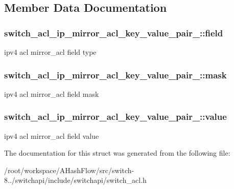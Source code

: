 \subsection{Member Data Documentation}
\hypertarget{structswitch__acl__ip__mirror__acl__key__value__pair___a58b2aea4bac0ee482f8e10d3db2c3076}{
\subsubsection[{field}]{ switch\+\_\+acl\+\_\+ip\+\_\+mirror\+\_\+acl\+\_\+key\+\_\+value\+\_\+pair\+\_\+\+::field}}\label{structswitch__acl__ip__mirror__acl__key__value__pair___a58b2aea4bac0ee482f8e10d3db2c3076}
ipv4 acl mirror\+\_\+acl field type \hypertarget{structswitch__acl__ip__mirror__acl__key__value__pair___a6c192f608bb8140f71580178ab7fb192}{
\subsubsection[{mask}]{ switch\+\_\+acl\+\_\+ip\+\_\+mirror\+\_\+acl\+\_\+key\+\_\+value\+\_\+pair\+\_\+\+::mask}}\label{structswitch__acl__ip__mirror__acl__key__value__pair___a6c192f608bb8140f71580178ab7fb192}
ipv4 acl mirror\+\_\+acl field mask \hypertarget{structswitch__acl__ip__mirror__acl__key__value__pair___a16e350a986e8419d206bee11e34e8726}{
\subsubsection[{value}]{ switch\+\_\+acl\+\_\+ip\+\_\+mirror\+\_\+acl\+\_\+key\+\_\+value\+\_\+pair\+\_\+\+::value}}\label{structswitch__acl__ip__mirror__acl__key__value__pair___a16e350a986e8419d206bee11e34e8726}
ipv4 acl mirror\+\_\+acl field value 

The documentation for this struct was generated from the following file\+:\begin{DoxyCompactItemize}
\item 
/root/workspace/\+A\+Hash\+Flow/src/switch-\/8../switchapi/include/switchapi/switch\+\_\+acl.\+h\end{DoxyCompactItemize}
